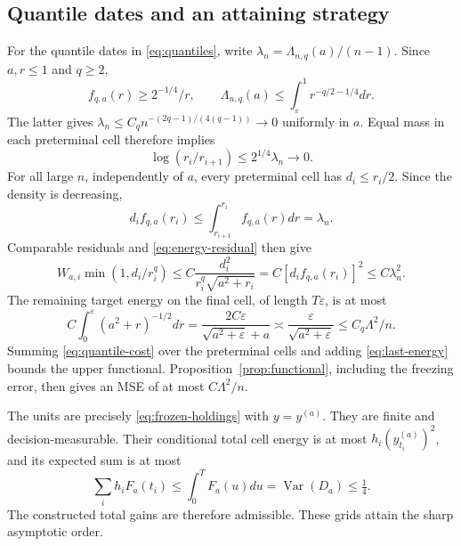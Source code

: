 \documentclass[11pt,a4paper]{amsart}
\theoremstyle{plain}
\theoremstyle{definition}
\theoremstyle{remark}
\DeclareMathOperator{\Var}{Var}
\newcommand{\eps}{\varepsilon}
\begin{document}
\subsection{Quantile dates and an attaining strategy}
For the quantile dates in \eqref{eq:quantiles}, write $\lambda_n=\Lambda_{n,q}(a)/(n-1)$. Since $a,r\le1$ and $q\ge2$,
\[
 f_{q,a}(r)\ge2^{-1/4}/r,\qquad
 \Lambda_{n,q}(a)\le\int_\eps^1r^{-q/2-1/4}dr.
\]
The latter gives $\lambda_n\le C_q n^{-(2q-1)/(4(q-1))}\to0$ uniformly in $a$. Equal mass in each preterminal cell therefore implies
\begin{equation}\label{eq:quantile-ratio}
 \log(r_i/r_{i+1})\le2^{1/4}\lambda_n\longrightarrow0.
\end{equation}
For all large $n$, independently of $a$, every preterminal cell has $d_i\le r_i/2$. Since the density is decreasing,
\[
 d_if_{q,a}(r_i)\le\int_{r_{i+1}}^{r_i}f_{q,a}(r)dr=\lambda_n.
\]
Comparable residuals and \eqref{eq:energy-residual} then give
\begin{equation}\label{eq:quantile-cost}
 W_{a,i}\min(1,d_i/r_i^q)
 \le C\frac{d_i^2}{r_i^q\sqrt{a^2+r_i}}
 =C[d_if_{q,a}(r_i)]^2\le C\lambda_n^2.
\end{equation}
The remaining target energy on the final cell, of length $T\eps$, is at most
\begin{equation}\label{eq:last-energy}
 C\int_0^\eps(a^2+r)^{-1/2}dr
 =\frac{2C\eps}{\sqrt{a^2+\eps}+a}
 \asymp\frac{\eps}{\sqrt{a^2+\eps}}
 \le C_q\Lambda^2/n.
\end{equation}
Summing \eqref{eq:quantile-cost} over the preterminal cells and adding \eqref{eq:last-energy} bounds the upper functional. Proposition~\ref{prop:functional}, including the freezing error, then gives an MSE of at most $C\Lambda^2/n$.

The units are precisely \eqref{eq:frozen-holdings} with $y=y^{(a)}$. They are finite and decision-measurable. Their conditional total cell energy is at most $h_i(y_{t_i}^{(a)})^2$, and its expected sum is at most
\[
 \sum_i h_iF_a(t_i)\le\int_0^TF_a(u)du=\Var(D_a)\le\tfrac14.
\]
The constructed total gains are therefore admissible. These grids attain the sharp asymptotic order.
\end{document}
